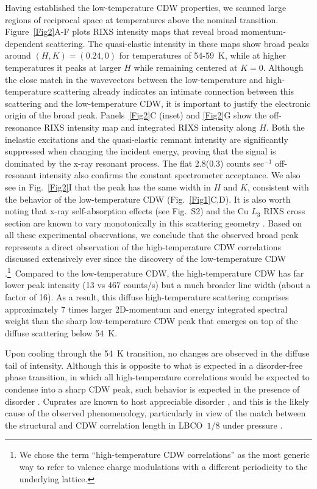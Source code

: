 \documentclass[9pt,twocolumn,twoside]{pnas-new}
\def\LBCO{LBCO~$1/8$}
\begin{document}
Having established the low-temperature CDW properties, we scanned large regions of reciprocal space at temperatures above the nominal transition. Figure~\ref{Fig2}A-F plots RIXS intensity maps that reveal broad momentum-dependent scattering. The quasi-elastic intensity in these maps show broad peaks around $(H, K)=(0.24,0)$ for temperatures of 54-59~K, while at higher temperatures it peaks at larger $H$ while remaining centered at $K=0$. Although the close match in the wavevectors between the low-temperature and high-temperature scattering already indicates an intimate connection between this scattering and the low-temperature CDW, it is important to justify the electronic origin of the broad peak. Panels~\ref{Fig2}C (inset) and \ref{Fig2}G show the off-resonance RIXS intensity map and integrated RIXS intensity along $H$. Both the inelastic excitations and the quasi-elastic remnant intensity are significantly suppressed when changing the incident energy, proving that the signal is dominated by the x-ray resonant process. The flat 2.8(0.3) counts sec$^{-1}$ off-resonant intensity also confirms the constant spectrometer acceptance.  We also see in Fig.~\ref{Fig2}I that the peak has the same width in $H$ and $K$, consistent with the behavior of the low-temperature CDW (Fig.~\ref{Fig1}C,D). It is also worth noting that x-ray self-absorption effects (see Fig.~S2) and the Cu $L_3$ RIXS cross section are known to vary monotonically in this scattering geometry \cite{Ament2011,  Ghiringhelli2012}. Based on all these experimental observations, we conclude that the observed broad peak represents a direct observation of the high-temperature CDW correlations discussed extensively ever since the discovery of the low-temperature CDW \cite{Tranquada1995, Kivelson2003, Vojta2009,Nie2014,Capati2015}.\footnote{We chose the term ``high-temperature CDW correlations'' as the most generic way to refer to valence charge modulations with a different periodicity to the underlying lattice.}\ Compared to the low-temperature CDW, the high-temperature CDW has far lower peak intensity (13 vs 467 counts/s) but a much broader line width (about a factor of 16). As a result, this diffuse high-temperature scattering comprises approximately 7 times larger 2D-momentum and energy integrated spectral weight than the sharp low-temperature CDW peak that emerges on top of the diffuse scattering below 54~K. 

Upon cooling through the 54~K transition, no changes are observed in the diffuse tail of intensity. Although this is opposite to what is expected in a disorder-free phase transition, in which all high-temperature correlations would be expected to condense into a sharp CDW peak, such behavior is expected in the presence of disorder \cite{Chatterjee2015, Nie2017}. Cuprates are known to host appreciable disorder \cite{Alloul2009, Hucker2010, Hucker2014, Campi2015}, and this is the likely cause of the observed phenomenology, particularly in view of the match between the structural and CDW correlation length in \LBCO{} under pressure \cite{Hucker2010}.
\end{document}
